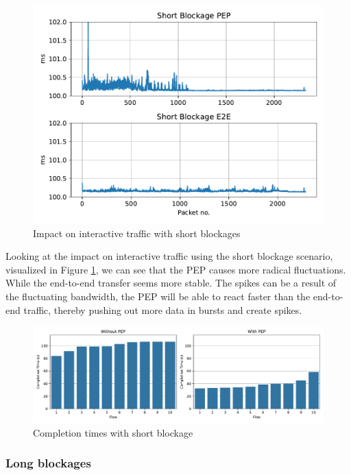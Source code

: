 \documentclass[a4paper,english, 11pt]{report}
\begin{document}
\begin{figure}[h!] %
	\centering
	\includegraphics[scale=0.50]{../diagrams/witestlab/shortblockage.pdf}
  	\caption{Impact on interactive traffic with short blockages}
  	\label{fig:sb_ultra}
\end{figure}

Looking at the impact on interactive traffic using the short blockage scenario, visualized in Figure \ref{fig:sb_ultra}, we can see that the PEP causes more radical fluctuations. While the end-to-end transfer seems more stable. The spikes can be a result of the fluctuating bandwidth, the PEP will be able to react faster than the end-to-end traffic, thereby pushing out more data in bursts and create spikes.


\begin{figure}[h!] %
	\centering
	\includegraphics[scale=0.40]{../diagrams/witestlab/sb_cubic_bar.pdf}
  	\caption{Completion times with short blockage}
  	\label{fig:witestlab_sb_fcts}
\end{figure}

\subsubsection{Long blockages}
\end{document}
